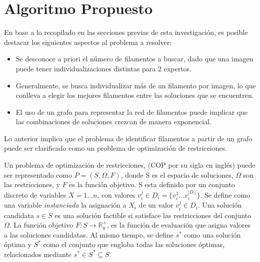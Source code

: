 \chapter{Algoritmo Propuesto}
\label{sec:modeloOpti}

En base a lo recopilado en las secciones previas de esta investigaci\'on, es posible destacar los siguientes aspectos al problema a resolver:

\begin{itemize}
    \item Se desconoce a priori el n\'umero de filamentos a buscar, dado que una imagen puede tener individualizaciones distintas para 2 expertos.
    \item Generalmente, se busca individualizar m\'as de un filamento por imagen, lo que conlleva a elegir los mejores filamentos entre las soluciones que se encuentren.
    \item El uso de un grafo para representar la red de filamentos puede implicar que las combinaciones de soluciones crezcan de manera exponencial.
\end{itemize}

Lo anterior implica que el problema de identificar filamentos a partir de un grafo puede ser clasificado como un problema de optimizaci\'on de restricciones\cite{blum2011hybrid}.

Un problema de optimización de restricciones, (COP por su sigla en ingl\'es) puede ser representado como $P = (S, \Omega, F)$, donde S es el espacio de soluciones, $\Omega$ son las restricciones, y $F$ es la funci\'on objetivo. S esta definido por un conjunto discreto de variables $X = 1 \dotsc n$, con valores $v_{i}^{j} \in D_{i} = \{v_{i}^{1} \dotsc  v_{i}^{|D_{i}|}\}$. Se define como una variable {\it instanciada} la asignaci\'on a $X_i$ de un valor $v_{i}^{j} \in D_i$. Una solución candidata $s \in S$ es una soluci\'on factible si satisface las restricciones del conjunto $\Omega$. La funci\'on objetivo $F: S\rightarrow \mathbb R_{0}^{+}$, es la funci\'on de evaluaci\'on que asigna valores a las soluciones candidatas. Al mismo tiempo, se define $s^{*}$ como una soluci\'on \'optima y $S^{*}$ como el conjunto que engloba todas las soluciones \'optimas, relacionados mediante $s^{*} \in S^{*} \subseteq S $\cite{socha2008ant}.

